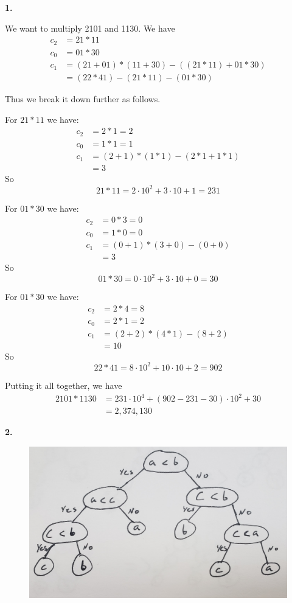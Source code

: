 \documentclass[letterpaper, 11pt]{article}
\newcommand{\hwnumber}[1]{\newpage \noindent\textbf{#1.} \smallskip}
\begin{document}
\hwnumber{1}

We want to multiply 2101 and 1130. We have 
\begin{align*}
  c_2 &= 21 * 11 \\
  c_0 &= 01 * 30 \\
  c_1 &= (21 + 01) * (11 + 30) - ((21 * 11) + 01 * 30)\\
      &= (22 * 41) - (21 * 11) - (01 * 30)
\end{align*}

Thus we break it down further as follows.

For \(21 * 11\) we have:
\begin{align*}
  c_2 &= 2 * 1 = 2 \\
  c_0 &= 1 * 1 = 1 \\
  c_1 &= (2 + 1) * (1 * 1) - (2 * 1 + 1 * 1)\\
      &= 3
\end{align*}
So 
\[21 * 11 = 2 \cdot 10^2 + 3\cdot 10 + 1 = 231\]

For \(01 * 30\) we have:
\begin{align*}
  c_2 &= 0 * 3 = 0 \\ 
  c_0 &= 1 * 0 = 0 \\
  c_1 &=  (0 + 1) * (3 + 0) - (0 + 0) \\
      &= 3
\end{align*}
So
\[01 * 30 = 0\cdot 10^2 + 3 \cdot 10 + 0 = 30\]

For \(01 * 30\) we have:
\begin{align*}
  c_2 &= 2 * 4 = 8 \\
  c_0 &= 2 * 1 = 2 \\
  c_1 &= (2 + 2) * (4 * 1) - (8 + 2)\\
      &= 10
\end{align*}
So 
\[22 * 41 = 8 \cdot 10^2 + 10 \cdot 10 + 2 = 902\]

Putting it all together, we have
\begin{align*}
  2101 * 1130 &= 231 \cdot 10^4 + (902 - 231 - 30) \cdot 10^2 + 30\\
              &= 2,374,130
\end{align*}

\hwnumber{2}

\begin{figure}[h!]
  \centering
  \includegraphics[width=\linewidth]{pics/num_2.jpg}
\end{figure}
\end{document}
